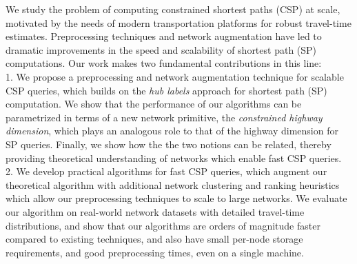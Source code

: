 We study the problem of computing constrained shortest paths (CSP) at scale, motivated by the needs of modern transportation platforms for robust travel-time estimates.
Preprocessing techniques and network augmentation have led to dramatic improvements in the speed and scalability of shortest path (SP) computations.
Our work makes two fundamental contributions in this line:\\
1. We propose a preprocessing and network augmentation technique for scalable CSP queries, which builds on the \emph{hub labels} approach for shortest path (SP) computation.
We show that the performance of our algorithms can be parametrized in terms of a new network primitive, the \emph{constrained highway dimension}, which plays an analogous role to that of the highway dimension for SP queries.
Finally, we show how the the two notions can be related, thereby providing theoretical understanding of networks which enable fast CSP queries.\\
2. We develop practical algorithms for fast CSP queries, which augment our theoretical algorithm with additional network clustering and ranking heuristics which allow our preprocessing techniques to scale to large networks. We evaluate our algorithm on real-world network datasets with detailed travel-time distributions, and show that our algorithms are orders of magnitude faster compared to existing techniques, and also have small per-node storage requirements, and good preprocessing times, even on a single machine.